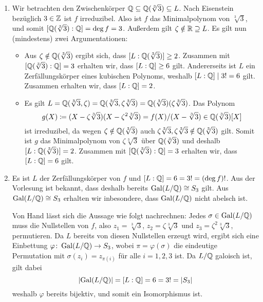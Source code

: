 \begin{solution}
\begin{enumerate}
    \item
      Wir betrachten den Zwischenkörper $\mathbb{Q} \subseteq \mathbb{Q}(\sqrt[3]{3}) \subseteq L$.
      Nach Eisenstein bezüglich $3 \in \mathbb{Z}$ ist $f$ irreduzibel.
      Also ist $f$ das Minimalpolynom von $\sqrt[3]{3}$, und somit $[\mathbb{Q}(\sqrt[3]{3}) : \mathbb{Q}] = \deg f = 3$.
      Außerdem gilt $\zeta \notin \mathbb{R} \supseteq L$.
      Es gilt nun (mindestens) zwei Argumentationen:
      \begin{itemize}
        \item
          Aus $\zeta \notin \mathbb{Q}(\sqrt[3]{3})$ ergibt sich, dass $[L : \mathbb{Q}(\sqrt[3]{3})] \geq 2$.
          Zusammen mit $[\mathbb{Q}(\sqrt[3]{3}) : \mathbb{Q}] = 3$ erhalten wir, dass $[L : \mathbb{Q}] \geq 6$ gilt.
          Andererseits ist $L$ ein Zerfällungskörper eines kubischen Polynoms, weshalb $[L : \mathbb{Q}] \mid 3! = 6$ gilt.
          Zusammen erhalten wir, dass $[L : \mathbb{Q}] = 2$.
        \item
          Es gilt $L = \mathbb{Q}(\sqrt[3]{3}, \zeta) = \mathbb{Q}(\sqrt[3]{3}, \zeta \sqrt[3]{3}) = \mathbb{Q}(\sqrt[3]{3})(\zeta \sqrt[3]{3})$.
          Das Polynom
          \[
                      g(X)
            \coloneqq (X - \zeta \sqrt[3]{3})(X - \zeta^2 \sqrt[3]{3})
            =         f(X)/(X-\sqrt[3]{3})
            \in       \mathbb{Q}(\sqrt[3]{3})[X]
          \]
          ist irreduzibel, da wegen $\zeta \notin \mathbb{Q}(\sqrt[3]{3})$ auch $\zeta \sqrt[3]{3}, \zeta \sqrt[3]{3} \notin \mathbb{Q}(\sqrt[3]{3})$ gilt.
          Somit ist $g$ das Minimalpolynom von $\zeta \sqrt[3]{3}$ über $\mathbb{Q}(\sqrt[3]{3})$ und deshalb $[L : \mathbb{Q}(\sqrt[3]{3})] = 2$.
          Zusammen mit $[\mathbb{Q}(\sqrt[3]{3}) : \mathbb{Q}] = 3$ erhalten wir, dass $[L : \mathbb{Q}] = 6$ gilt.
      \end{itemize}
          
    \item
      Es ist $L$ der Zerfällungskörper von $f$ und $[L : \mathbb{Q}] = 6 = 3! = (\deg f)!$.
      Aus der Vorlesung ist bekannt, dass deshalb bereits $\operatorname{Gal}(L/\mathbb{Q}) \cong S_3$ gilt.
      Aus $\operatorname{Gal}(L/\mathbb{Q}) \cong S_3$ erhalten wir inbesondere, dass $\operatorname{Gal}(L/\mathbb{Q})$ nicht abelsch ist.
      
      Von Hand lässt sich die Aussage wie folgt nachrechnen:
      Jedes $\sigma \in \operatorname{Gal}(L/\mathbb{Q})$ muss die Nullstellen von $f$, also $z_1 = \sqrt[3]{3}$, $z_2 = \zeta \sqrt[3]{3}$ und $z_3 = \zeta^2 \sqrt[3]{3}$, permutieren.
      Da $L$ bereits von diesen Nullstellen erzeugt wird, ergibt sich eine Einbettung $\varphi \colon \operatorname{Gal}(L/\mathbb{Q}) \to S_3$, wobei $\pi = \varphi(\sigma)$ die eindeutige Permutation mit $\sigma(z_i) = z_{\pi(i)}$ für alle $i = 1, 2, 3$ ist.
      Da $L/\mathbb{Q}$ galoisch ist, gilt dabei
      \[
          |{\operatorname{Gal}(L/\mathbb{Q})}|
        = [L : \mathbb{Q}]
        = 6
        = 3!
        = |S_3|
      \]
      weshalb $\varphi$ bereits bijektiv, und somit ein Isomorphismus ist.
  \end{enumerate}
\end{solution}


